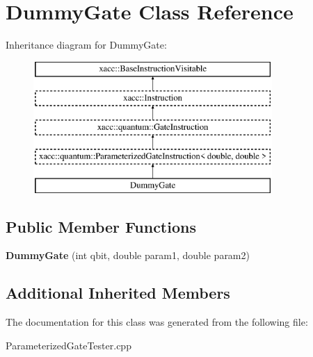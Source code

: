 \hypertarget{a01332}{}\section{Dummy\+Gate Class Reference}
\label{a01332}
Inheritance diagram for Dummy\+Gate\+:\begin{figure}[H]
\begin{center}
\leavevmode
\includegraphics[height=5.000000cm]{a01332}
\end{center}
\end{figure}
\subsection*{Public Member Functions}
\begin{DoxyCompactItemize}
\item 
\mbox{\label{a01332_a64005aff4bba279a321a3d24695834eb}} 
{\bfseries Dummy\+Gate} (int qbit, double param1, double param2)
\end{DoxyCompactItemize}
\subsection*{Additional Inherited Members}


The documentation for this class was generated from the following file\+:\begin{DoxyCompactItemize}
\item 
Parameterized\+Gate\+Tester.\+cpp\end{DoxyCompactItemize}
